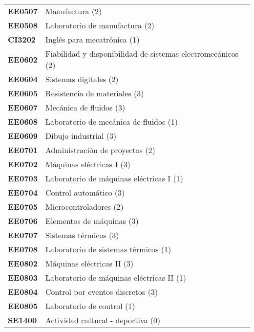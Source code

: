 \documentclass[letterpaper]{article}%
\begin{document}
\begin{tabularx}{\textwidth}{p{1.5cm}p{10cm}}
\textbf{EE0507}&Manufactura (2)\\%
\textbf{EE0508}&Laboratorio de manufactura (2)\\%
\textbf{CI3202}&Inglés para mecatrónica (1)\\%
\textbf{EE0602}&Fiabilidad y disponibilidad de sistemas electromecánicos (2)\\%
\textbf{EE0604}&Sistemas digitales (2)\\%
\textbf{EE0605}&Resistencia de materiales (3)\\%
\textbf{EE0607}&Mecánica de fluidos (3)\\%
\textbf{EE0608}&Laboratorio de mecánica de fluidos (1)\\%
\textbf{EE0609}&Dibujo industrial (3)\\%
\textbf{EE0701}&Administración de proyectos (2)\\%
\textbf{EE0702}&Máquinas eléctricas I (3)\\%
\textbf{EE0703}&Laboratorio de máquinas eléctricas I (1)\\%
\textbf{EE0704}&Control automático (3)\\%
\textbf{EE0705}&Microcontroladores (2)\\%
\textbf{EE0706}&Elementos de máquinas (3)\\%
\textbf{EE0707}&Sistemas térmicos (3)\\%
\textbf{EE0708}&Laboratorio de sistemas térmicos (1)\\%
\textbf{EE0802}&Máquinas eléctricas II (3)\\%
\textbf{EE0803}&Laboratorio de máquinas eléctricas II (1)\\%
\textbf{EE0804}&Control por eventos discretos (3)\\%
\textbf{EE0805}&Laboratorio de control (1)\\%
\textbf{SE1400}&Actividad cultural {-} deportiva (0)\\%
\end{tabularx}

%
\end{document}
